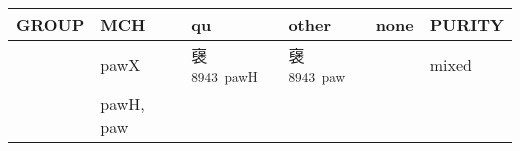 \documentclass[14pt,a4paper]{scrartcl}
\begin{document}
\begin{longtable}[c]{@{}llllll@{}}
\toprule
\begin{minipage}[b]{0.14\columnwidth}\raggedright\strut
GROUP
\strut\end{minipage} &
\begin{minipage}[b]{0.14\columnwidth}\raggedright\strut
MCH
\strut\end{minipage} &
\begin{minipage}[b]{0.14\columnwidth}\raggedright\strut
qu
\strut\end{minipage} &
\begin{minipage}[b]{0.14\columnwidth}\raggedright\strut
other
\strut\end{minipage} &
\begin{minipage}[b]{0.14\columnwidth}\raggedright\strut
none
\strut\end{minipage} &
\begin{minipage}[b]{0.14\columnwidth}\raggedright\strut
PURITY
\strut\end{minipage}\tabularnewline
\midrule
\endhead
\begin{minipage}[t]{0.14\columnwidth}\raggedright\strut
𠊻
\strut\end{minipage} &
\begin{minipage}[t]{0.14\columnwidth}\raggedright\strut
pawX
\strut\end{minipage} &
\begin{minipage}[t]{0.14\columnwidth}\raggedright\strut
襃\textsuperscript{8943~pawH}
\strut\end{minipage} &
\begin{minipage}[t]{0.14\columnwidth}\raggedright\strut
襃\textsuperscript{8943~paw}
\strut\end{minipage} &
\begin{minipage}[t]{0.14\columnwidth}\raggedright\strut
\strut\end{minipage} &
\begin{minipage}[t]{0.14\columnwidth}\raggedright\strut
mixed
\strut\end{minipage}\tabularnewline
\begin{minipage}[t]{0.14\columnwidth}\raggedright\strut
𤓽
\strut\end{minipage} &
\begin{minipage}[t]{0.14\columnwidth}\raggedright\strut
pawH, paw
\strut\end{minipage} &
\begin{minipage}[t]{0.14\columnwidth}\raggedright\strut
\strut\end{minipage} &

\end{longtable}
\end{document}
